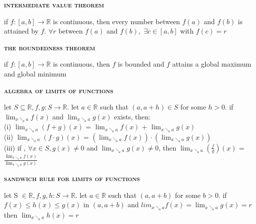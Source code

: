 \documentclass[a4paper]{article}
\begin{document}
\begin{multicols}{2}
\begin{framed}
	\begin{center}
		\textbf{\textsc{intermediate value theorem}}
	\end{center}
	if $f:[a,b] \rightarrow \mathbb{R}$ is continuous, then every number between $f(a)$ and $f(b)$ is attained by $f$. $\forall r$ between $f(a)$ and $f(b)$, $\, \exists c \in [a,b]$ with $f(c) = r$
\end{framed}

\begin{framed}
	\begin{center}
		\textbf{\textsc{the boundedness theorem}}
	\end{center}
	if $f:[a,b] \rightarrow \mathbb{R}$ is continuous, then $f$ is bounded and $f$ attains a global maximum and global minimum 
\end{framed}

\begin{framed}
	\begin{center}
		\textbf{\textsc{algebra of limits of functions}}
	\end{center}
	let $S \subseteq \mathbb{R}, f,g: S \rightarrow \mathbb{R}$. let $a \in \mathbb{R}$ such that $(a, a+h) \in S$ for some $h > 0$. if $\lim_{x \searrow a}f(x)$ and $\lim_{x \searrow a}g(x)$ exists, then:\\
	(i) $\lim_{x \searrow a}(f+g)(x)$ = $\lim_{x \searrow a}f(x)$ + $\lim_{x \searrow a}g(x)$\\
	(ii) $\lim_{x \searrow a}(f\cdot g)(x)$ = $(\lim_{x \searrow a}f(x)) \cdot (\lim_{x \searrow a}g(x))$\\
	(iii) if , $\forall x \in S, g(x) \neq 0$ and $\lim_{x \searrow a}g(x) \neq 0$, then $\lim_{x \searrow a}(\frac{f}{g})(x)$ = $\frac{\lim_{x \searrow a}f(x)}{\lim_{x \searrow a}g(x)}$\\
\end{framed}

\begin{framed}
	\begin{center}
		\textbf{\textsc{sandwich rule for limits of functions}}
	\end{center}
	let S $\in \mathbb{R}, f,g,h: S \rightarrow \mathbb{R}.$ let $a \in \mathbb{R}$ such that $(a, a+b)$ for some $b > 0$. if $f(x) \leq h(x) \leq g(x)$ in $(a, a+b)$ and $lim_{x \searrow a}f(x) = \lim_{x \searrow a}g(x) = r$ then $\lim_{x \searrow a}h(x) = r$
\end{framed}


\end{multicols}
\end{document}
